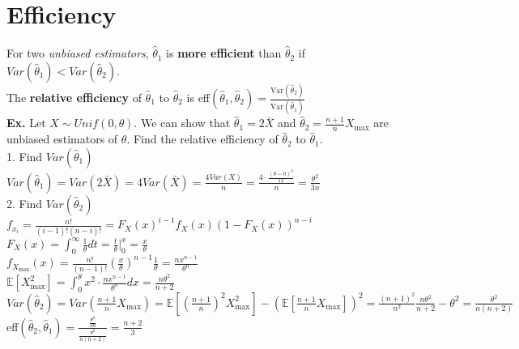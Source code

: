 \documentclass{article}
\begin{document}
\section{Efficiency}
\label{sec:efficiency}
For two \textit{unbiased estimators}, $\hat\theta_1$ is \textbf{more efficient} than $\hat\theta_2$ if $Var(\hat\theta_1)<Var(\hat\theta_2)$.\\
The \textbf{relative efficiency} of $\hat\theta_1$ to $\hat\theta_2$ is eff$(\hat\theta_1,\hat\theta_2)=\frac{\text{Var}(\hat\theta_2)}{\text{Var}(\hat\theta_1)}$\\
\textbf{Ex.} Let $X\sim Unif(0,\theta)$. We can show that $\hat\theta_1=2\bar X$ and $\hat\theta_2=\frac{n+1}{n}X_{\text{max}}$ are unbiased estimators of $\theta$. Find the relative efficiency of $\hat\theta_2$ to $\hat\theta_1$.\\
1. Find $Var(\hat\theta_1)$\\
$Var(\hat\theta_1)=Var(2\bar X)=4Var(\bar X)=\frac{4Var(X)}{n}=\frac{4\cdot\frac{(\theta-0)^2}{12}}{n}=\frac{\theta^2}{3n}$\\
2. Find $Var(\hat\theta_2)$\\
$f_{x_i}=\frac{n!}{(i-1)!(n-i)!}=F_X(x)^{i-1}f_X(x)(1-F_X(x))^{n-i}$\\
$F_X(x)=\int_0^\infty\frac{1}{\theta}dt=\frac{t}{\theta}\bigg \vert_0^x=\frac{x}{\theta}$\\
$f_{X_{\text{max}}}(x)=\frac{n!}{(n-1)!}(\frac{x}{\theta})^{n-1}\frac{1}{\theta}=\frac{nx^{n-1}}{\theta^n}$\\
$\mathbb{E}[X_{\text{max}}^2]=\int_0^\theta x^2\cdot\frac{nx^{n-1}}{\theta^n}dx=\frac{n\theta^2}{n+2}$\\
$Var(\hat\theta_2)=Var(\frac{n+1}{n}X_{\text{max}})=\mathbb{E}[(\frac{n+1}{n})^2X_{\text{max}}^2]-(\mathbb{E}[\frac{n+1}{n}X_{\text{max}}])^2=\frac{(n+1)^2}{n^2}\frac{n\theta^2}{n+2}-\theta^2=\frac{\theta^2}{n(n+2)}$\\
eff$(\hat\theta_2,\hat\theta_1)=\frac{\frac{\theta^2}{3n}}{\frac{\theta^2}{n(n+2)}}=\frac{n+2}{3}$
\end{document}
